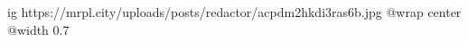  
 
 
 
 

\ifcmt
  ig https://mrpl.city/uploads/posts/redactor/acpdm2hkdi3ras6b.jpg
  @wrap center
  @width 0.7
\fi
